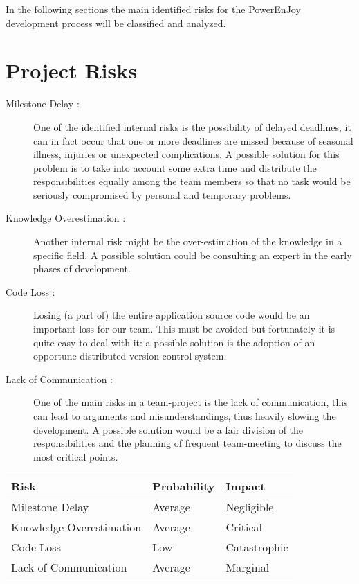 In the following sections the main identified risks for the PowerEnJoy development process will be classified and analyzed. 

\section{Project Risks}
\begin{description}
	\item[Milestone Delay :] One of the identified internal risks is the possibility of delayed deadlines, it can in fact occur that one or more deadlines are missed because of seasonal illness, injuries or unexpected complications. A possible solution for this problem is to take into account some extra time and distribute the responsibilities equally among the team members so that no task would be seriously compromised by personal and temporary problems.
	\item[Knowledge Overestimation :] Another internal risk might be the over-estimation of the knowledge in a specific field. A possible solution could be consulting an expert in the early phases of development.
	\item[Code Loss :] Losing (a part of) the entire application source code would be an important loss for our team. This must be avoided but fortunately it is quite easy to deal with it: a possible solution is the adoption of an opportune distributed version-control system.
	\item[Lack of Communication :] One of the main risks in a team-project is the lack of communication, this can lead to arguments and misunderstandings, thus heavily slowing the development. A possible solution would be a fair division of the responsibilities and the planning of frequent team-meeting to discuss the most critical points.
\end{description}

\begin{center}
  \begin{tabular}{ |l|l|l| }
    \hline
    Risk & Probability & Impact \\ \hline
    Milestone Delay & Average & Negligible \\ \hline
    Knowledge Overestimation & Average & Critical \\ \hline
    Code Loss & Low & Catastrophic \\ \hline
    Lack of Communication & Average & Marginal \\ \hline
  \end{tabular}
\end{center}


